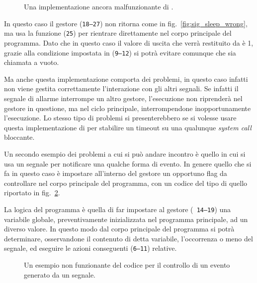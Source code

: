 \begin{figure}[!htb]
  \footnotesize \centering
  \begin{minipage}[c]{\codesamplewidth}
  \end{minipage}
  \normalsize 
  \caption{Una implementazione ancora malfunzionante di .} 
  \label{fig:sig_sleep_incomplete}
\end{figure}

In questo caso il gestore (\texttt{\small 18--27}) non ritorna come in
fig.~\ref{fig:sig_sleep_wrong}, ma usa la funzione 
(\texttt{\small 25}) per rientrare direttamente nel corpo principale del
programma. Dato che in questo caso il valore di uscita che verrà restituito da
 è 1, grazie alla condizione impostata in (\texttt{\small 9--12})
si potrà evitare comunque che  sia chiamata a vuoto.

Ma anche questa implementazione comporta dei problemi, in questo caso infatti
non viene gestita correttamente l'interazione con gli altri segnali. Se
infatti il segnale di allarme interrompe un altro gestore, l'esecuzione non
riprenderà nel gestore in questione, ma nel ciclo principale, interrompendone
inopportunamente l'esecuzione.  Lo stesso tipo di problemi si presenterebbero
se si volesse usare questa implementazione di  per stabilire un
timeout su una qualunque \textit{system call} bloccante.

Un secondo esempio dei problemi a cui si può andare incontro è quello in cui
si usa un segnale per notificare una qualche forma di evento. In genere quello
che si fa in questo caso è impostare all'interno del gestore un opportuno flag
da controllare nel corpo principale del programma, con un codice del tipo di
quello riportato in fig.~\ref{fig:sig_event_wrong}.

La logica del programma è quella di far impostare al gestore (\texttt{\small
  14--19}) una variabile globale, preventivamente inizializzata nel programma
principale, ad un diverso valore. In questo modo dal corpo principale del
programma si potrà determinare, osservandone il contenuto di detta variabile,
l'occorrenza o meno del segnale, ed eseguire le azioni conseguenti
(\texttt{\small 6--11}) relative.

\begin{figure}[!htbp]
  \footnotesize\centering
  \begin{minipage}[c]{\codesamplewidth}
  \end{minipage}
  \normalsize 
  \caption{Un esempio non funzionante del codice per il controllo di un
    evento generato da un segnale.}
  \label{fig:sig_event_wrong}
\end{figure}


